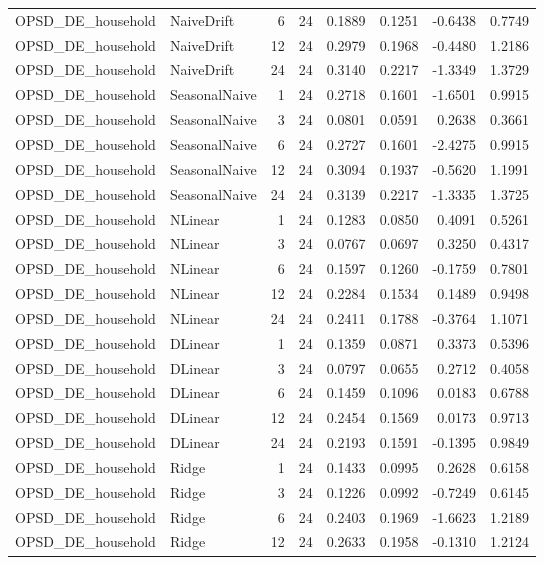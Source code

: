\begin{tabular}{llrrrrrr}
OPSD_DE_household & NaiveDrift & 6 & 24 & 0.1889 & 0.1251 & -0.6438 & 0.7749 \\
OPSD_DE_household & NaiveDrift & 12 & 24 & 0.2979 & 0.1968 & -0.4480 & 1.2186 \\
OPSD_DE_household & NaiveDrift & 24 & 24 & 0.3140 & 0.2217 & -1.3349 & 1.3729 \\
OPSD_DE_household & SeasonalNaive & 1 & 24 & 0.2718 & 0.1601 & -1.6501 & 0.9915 \\
OPSD_DE_household & SeasonalNaive & 3 & 24 & 0.0801 & 0.0591 & 0.2638 & 0.3661 \\
OPSD_DE_household & SeasonalNaive & 6 & 24 & 0.2727 & 0.1601 & -2.4275 & 0.9915 \\
OPSD_DE_household & SeasonalNaive & 12 & 24 & 0.3094 & 0.1937 & -0.5620 & 1.1991 \\
OPSD_DE_household & SeasonalNaive & 24 & 24 & 0.3139 & 0.2217 & -1.3335 & 1.3725 \\
OPSD_DE_household & NLinear & 1 & 24 & 0.1283 & 0.0850 & 0.4091 & 0.5261 \\
OPSD_DE_household & NLinear & 3 & 24 & 0.0767 & 0.0697 & 0.3250 & 0.4317 \\
OPSD_DE_household & NLinear & 6 & 24 & 0.1597 & 0.1260 & -0.1759 & 0.7801 \\
OPSD_DE_household & NLinear & 12 & 24 & 0.2284 & 0.1534 & 0.1489 & 0.9498 \\
OPSD_DE_household & NLinear & 24 & 24 & 0.2411 & 0.1788 & -0.3764 & 1.1071 \\
OPSD_DE_household & DLinear & 1 & 24 & 0.1359 & 0.0871 & 0.3373 & 0.5396 \\
OPSD_DE_household & DLinear & 3 & 24 & 0.0797 & 0.0655 & 0.2712 & 0.4058 \\
OPSD_DE_household & DLinear & 6 & 24 & 0.1459 & 0.1096 & 0.0183 & 0.6788 \\
OPSD_DE_household & DLinear & 12 & 24 & 0.2454 & 0.1569 & 0.0173 & 0.9713 \\
OPSD_DE_household & DLinear & 24 & 24 & 0.2193 & 0.1591 & -0.1395 & 0.9849 \\
OPSD_DE_household & Ridge & 1 & 24 & 0.1433 & 0.0995 & 0.2628 & 0.6158 \\
OPSD_DE_household & Ridge & 3 & 24 & 0.1226 & 0.0992 & -0.7249 & 0.6145 \\
OPSD_DE_household & Ridge & 6 & 24 & 0.2403 & 0.1969 & -1.6623 & 1.2189 \\
OPSD_DE_household & Ridge & 12 & 24 & 0.2633 & 0.1958 & -0.1310 & 1.2124 \\

\end{tabular}

